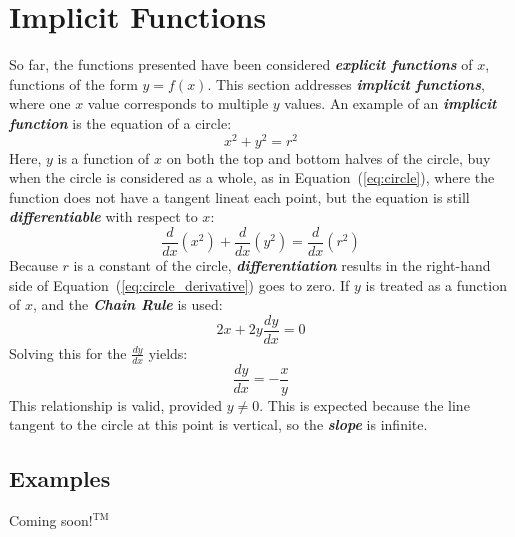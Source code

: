 \section{Implicit Functions}
So far, the functions presented have been considered \textbf{\textit{explicit functions}} of $x$, functions of the form $y = f(x)$. This section addresses \textbf{\textit{implicit functions}}, where one $x$ value corresponds to multiple $y$ values. An example of an \textbf{\textit{implicit function}} is the equation of a circle:
%
\begin{equation}
\label{eq:circle}
x^2 + y^2 = r^2
\end{equation}
%
Here, $y$ is a function of $x$ on both the top and bottom halves of the circle, buy when the circle is considered as a whole, as in Equation~(\ref{eq:circle}), where the function does not have a tangent lineat each point, but the equation is still \textbf{\textit{differentiable}} with respect to $x$:
%
\begin{equation}
\label{eq:circle_derivative}
\frac{d}{dx}\left(x^2\right) + \frac{d}{dx}\left(y^2\right) = \frac{d}{dx}\left(r^2\right)
\end{equation}
%
Because $r$ is a constant of the circle, \textbf{\textit{differentiation}} results in the right-hand side of Equation~(\ref{eq:circle_derivative}) goes to zero. If $y$ is treated as a function of $x$, and the \textbf{\textit{Chain Rule}} is used:
%
\begin{equation}
2x + 2y\frac{dy}{dx} = 0
\end{equation}
%
Solving this for the $\frac{dy}{dx}$ yields:
%
\begin{equation}
\frac{dy}{dx} = -\frac{x}{y}
\end{equation}
%
This relationship is valid, provided $y \neq 0$. This is expected because the line tangent to the circle at this point is vertical, so the \textbf{\textit{slope}} is infinite.
\begin{center}
\section*{\small Examples}
Coming soon$!^{\text{TM}}$
\end{center}

